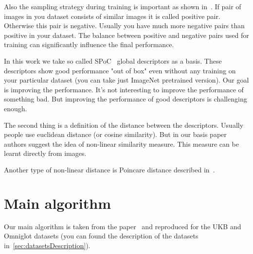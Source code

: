 \documentclass[a4paper,12pt]{extreport}
\begin{document}
    Also the sampling strategy during training is important as shown in~\cite{margin}.
    If pair of images in you dataset consists of similar images it is called positive pair.
    Otherwise this pair is negative.
    Usually you have much more negative pairs than positive in your dataset.
    The balance between positive and negative pairs used for training can significantly influence the final performance.


    In this work we take so called SPoC~\cite{spoc} global descriptors as a basis.
    These descriptors show good performance "out of box" even without any training on your particular dataset
    (you can take just ImageNet pretrained version).
    Our goal is improving the performance.
    It's not interesting to improve the performance of something bad.
    But improving the performance of good descriptors is challenging enough.
    \newline

    The second thing is a definition of the distance between the descriptors.
    Usually people use euclidean distance (or cosine similarity).
    But in our basis paper~\cite{original_paper} authors suggest the idea of non-linear similarity measure.
    This measure can be learnt directly from images.

    Another type of non-linear distance is Poincare distance described in~\cite{poincare}.

    \chapter{Main algorithm}\label{ch:resultsAtTheEndOfTheTerm3}

    Our main algorithm is taken from the paper~\cite{original_paper} and reproduced for the UKB and Omniglot datasets
    (you can found the description of the datasets in~\ref{sec:datasetsDescription}).
    \newline
\end{document}
